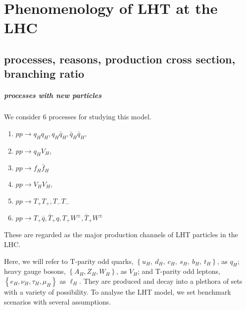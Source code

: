\chapter{Phenomenology of LHT at the LHC}
\label{chap:LHTsetup}
% 
% 
\section{ processes, reasons, production cross section, branching ratio}

\paragraph{processes with new particles}
We consider 6 processes for studying this model.  
\begin{enumerate}
\item $p p \rightarrow q_H q_H, q_H \bar{q}_H, \bar{q}_H \bar{q}_H$,
\item $p p \rightarrow q_H V_H$,
\item $p p \rightarrow f_H \bar{f}_H$
\item $p p \rightarrow V_H V_H$,
\item $p p \rightarrow T_+ T_+, T_- T_-$
\item $p p \rightarrow T_+ \bar{q}, \bar{T}_+ q, T_+ W^\pm, \bar{T}_+ W^\pm$
\end{enumerate}
These are regarded as the major production channels of LHT particles in the LHC.

Here, we will refer to T-parity odd quarks, $\left\{u_H,~d_H,~c_H,~s_H,~b_H,~t_H\right\}$, as $q_H$; 
heavy gauge bosons, $\left\{ A_H, Z_H, W_H \right\}$, as $V_H$; and
T-parity odd leptons, $\left\{ e_H, \nu_H, \tau_H, \mu_H \right\}$ as $\ell_H$. 
They are produced and decay into a plethora of sets with a variety of possibility. 
To analyse the LHT model, we set benchmark scenarios with several assumptions.


